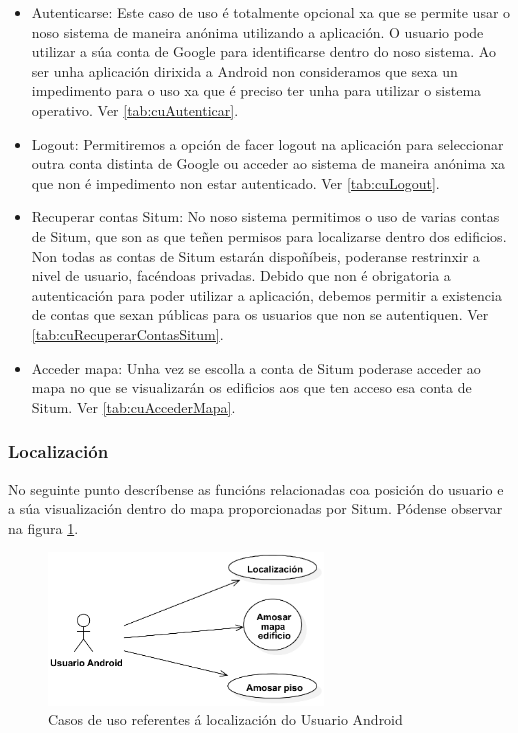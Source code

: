 \begin{itemize}
	\item Autenticarse: Este caso de uso é totalmente opcional xa que se permite usar o noso sistema de maneira anónima utilizando a aplicación. O usuario pode utilizar a súa conta de Google para identificarse dentro do noso sistema. Ao ser unha aplicación dirixida a Android non consideramos que sexa un impedimento para o uso xa que é preciso ter unha para utilizar o sistema operativo. Ver \ref{tab:cuAutenticar}.
	\item Logout: Permitiremos a opción de facer logout na aplicación para seleccionar outra conta distinta de Google ou acceder ao sistema de maneira anónima xa que non é impedimento non estar autenticado. Ver \ref{tab:cuLogout}.
	\item Recuperar contas Situm: No noso sistema permitimos o uso de varias contas de Situm, que son as que teñen permisos para localizarse dentro dos edificios. Non todas as contas de Situm estarán dispoñíbeis, poderanse restrinxir a nivel de usuario, facéndoas privadas. Debido que non é obrigatoria a autenticación para poder utilizar a aplicación, debemos permitir a existencia de contas que sexan públicas para os usuarios que non se autentiquen. Ver \ref{tab:cuRecuperarContasSitum}.
	\item Acceder mapa: Unha vez se escolla a conta de Situm poderase acceder ao mapa no que se visualizarán os edificios aos que ten acceso esa conta de Situm. Ver \ref{tab:cuAccederMapa}.
\end{itemize}

\subsubsection{Localización}
No seguinte punto descríbense as funcións relacionadas coa posición do usuario e a súa visualización dentro do mapa proporcionadas por Situm. Pódense observar na figura \ref{fig:cuUsuarioAndroidPrincipalLocalizacion}.

\begin{figure}[tbp]
	\begin{center}
		\includegraphics[width=0.65\textwidth]{figures/CasosUso/UsuarioAndroidLocalizacion}
		\caption{Casos de uso referentes á localización do Usuario Android}
		\label{fig:cuUsuarioAndroidPrincipalLocalizacion}
	\end{center}
\end{figure}

